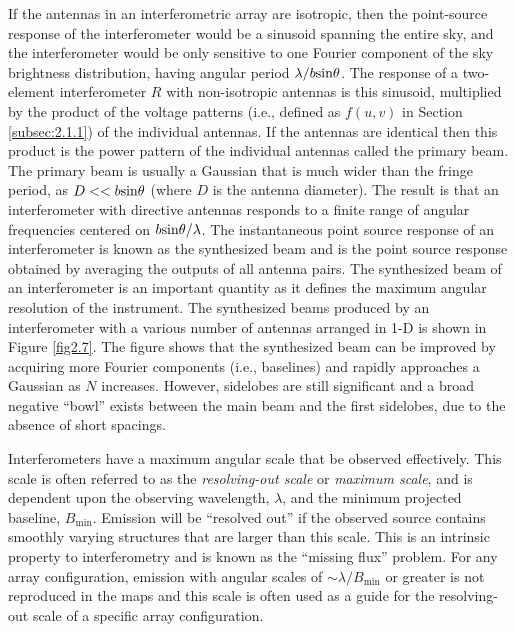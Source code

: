 If the antennas in an interferometric array are isotropic, then the  point-source response of the interferometer would be a sinusoid spanning the entire sky, and the interferometer would be only sensitive to one Fourier component of the sky brightness distribution, having angular period $\lambda/b\rm{sin}\theta$. The response of a two-element interferometer $R$ with non-isotropic antennas is this sinusoid, multiplied by the product of the voltage patterns (i.e., defined as $f(u,v)$ in Section \ref{subsec:2.1.1}) of the individual antennas. If the antennas are identical then this product is the power pattern of the individual antennas called the primary beam. The primary beam is usually a Gaussian that is much wider than the fringe period, as $D << b\rm{sin}\theta$ (where $D$ is the antenna diameter). The result is that an interferometer with directive antennas responds to a finite range of angular frequencies centered on $b\rm{sin}\theta /\lambda$. The instantaneous point source response of an interferometer is known as the synthesized beam and is the point source response obtained by averaging the outputs of all antenna pairs. The synthesized beam of an interferometer is an important quantity as it defines the maximum angular resolution of the instrument. The synthesized beams produced by an interferometer with a various number of antennas arranged in 1-D is shown in Figure \ref{fig2.7}. The figure shows that the synthesized beam can be improved by acquiring more Fourier components (i.e., baselines) and rapidly approaches a Gaussian as $N$ increases. However, sidelobes are still significant and a broad negative ``bowl'' exists between the main beam and the first sidelobes, due to the absence of short spacings.

Interferometers have a maximum angular scale that be observed effectively. This scale is often referred to as the \textit{resolving-out scale} or \textit{maximum scale}, and is dependent upon the observing wavelength, $\lambda$, and the minimum projected baseline, $B_{\mathrm{min}}$. Emission will be ``resolved out'' if the observed source contains smoothly varying structures that are larger than this scale. This is an intrinsic property to interferometry and is known as the ``missing flux'' problem. For any array configuration, emission with angular scales of $\sim \lambda/B_{\mathrm{min}}$ or greater is not reproduced in the maps \citep{taylor_1999} and this scale is often used as a guide for the resolving-out scale of a specific array configuration.


